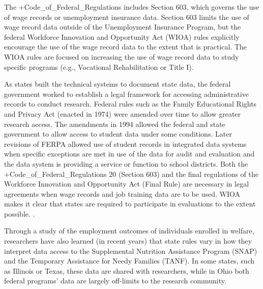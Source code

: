 \documentclass[
]{book}
\begin{document}
The +Code\_of\_Federal\_Regulations\textbar{} includes Section 603, which governs the use of wage records or unemployment insurance data. Section 603 limits the use of wage record data outside of the Unemployment Insurance Program, but the federal Workforce Innovation and Opportunity Act (WIOA) rules explicitly encourage the use of the wage record data to the extent that is practical. The WIOA rules are focused on increasing the use of wage record data to study specific programs (e.g., Vocational Rehabilitation or Title I).

As states built the technical systems to document state data, the federal government worked to establish a legal framework for accessing administrative records to conduct research. Federal rules such as the Family Educational Rights and Privacy Act (enacted in 1974) were amended over time to allow greater research access. The amendments in 1994 allowed the federal and state government to allow access to student data under some conditions. Later revisions of FERPA allowed use of student records in integrated data systems when specific exceptions are met in use of the data for audit and evaluation and the data system is providing a service or function to school districts. Both the +Code\_of\_Federal\_Regulations\textbar{} 20 (Section 603) and the final regulations of the Workforce Innovation and Opportunity Act (Final Rule) are necessary in legal agreements when wage records and job training data are to be used. WIOA makes it clear that states are required to participate in evaluations to the extent possible. \citep{officeofthefederalregister2016a}.

Through a study of the employment outcomes of individuals enrolled in welfare, researchers have also learned (in recent years) that state rules vary in how they interpret data access to the Supplemental Nutrition Assistance Program (SNAP) and the Temporary Assistance for Needy Families (TANF). In some states, such as Illinois or Texas, these data are shared with researchers, while in Ohio both federal programs' data are largely off-limits to the research community.
\end{document}
